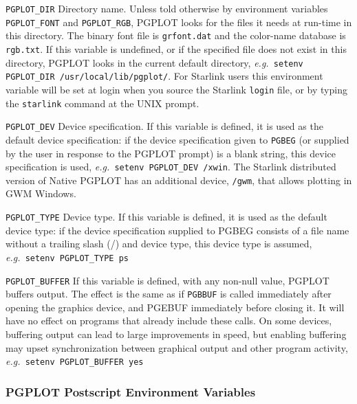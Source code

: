 \documentclass[twoside,11pt]{starlink}
\begin{document}
\begin{description}

\item{\texttt{PGPLOT\_DIR}} Directory name. Unless told otherwise by
environment variables \texttt{PGPLOT\_FONT} and \texttt{PGPLOT\_RGB}, PGPLOT
looks for the files it needs at run-time in this directory. The binary
font file is \texttt{grfont.dat} and the color-name database is \texttt{rgb.txt}. If this variable is undefined, or if the specified file does
not exist in this directory, PGPLOT looks in the current default
directory, \emph{e.g.\ }\texttt{setenv PGPLOT\_DIR
/usr/local/lib/pgplot/}. For Starlink users this environment variable
will be set at login when you source the Starlink \texttt{login} file, or
by typing the \texttt{starlink} command at the UNIX prompt.

\item{\texttt{PGPLOT\_DEV}} Device specification. If this variable is
defined, it is used as the default device specification: if the device
specification given to \texttt{PGBEG} (or supplied by the user in
response to the PGPLOT prompt) is a blank string, this device
specification is used, \emph{e.g.\ }\texttt{setenv PGPLOT\_DEV /xwin}. The
Starlink distributed version of Native PGPLOT has an additional
device, \texttt{/gwm}, that allows plotting in GWM Windows.

\item{\texttt{PGPLOT\_TYPE}} Device type. If this variable is defined, it
is used as the default device type: if the device specification
supplied to PGBEG consists of a file name without a trailing slash (/)
and device type, this device type is assumed, \emph{e.g.\ }\texttt{setenv
PGPLOT\_TYPE ps}

\item{\texttt{PGPLOT\_BUFFER}} If this variable is defined, with any
non-null value, PGPLOT buffers output. The effect is the same as if
\texttt{PGBBUF} is called immediately after opening the graphics device,
and PGEBUF immediately before closing it. It will have no effect on
programs that already include these calls. On some devices, buffering
output can lead to large improvements in speed, but enabling buffering
may upset synchronization between graphical output and other program
activity, \emph{e.g.\ }\texttt{setenv PGPLOT\_BUFFER yes}

\end{description}

\subsubsection{PGPLOT Postscript
Environment Variables\label{sc15_pgplot_postscript}}
\end{document}
